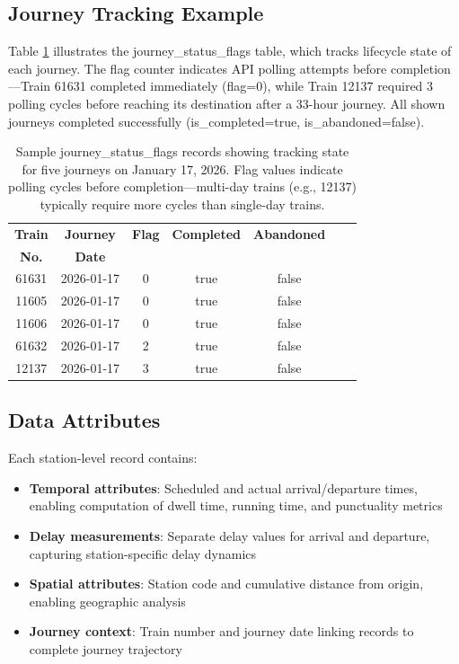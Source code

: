 \documentclass[11pt,a4paper]{article}
\begin{document}
\subsection{Journey Tracking Example}

Table \ref{tab:journey_flags} illustrates the journey\_status\_flags table, which tracks lifecycle state of each journey. The flag counter indicates API polling attempts before completion—Train 61631 completed immediately (flag=0), while Train 12137 required 3 polling cycles before reaching its destination after a 33-hour journey. All shown journeys completed successfully (is\_completed=true, is\_abandoned=false).

\begin{table}[h]
\centering
\small
\begin{tabular}{@{}ccccccc@{}}
\toprule
\textbf{Train} & \textbf{Journey} & \textbf{Flag} & \textbf{Completed} & \textbf{Abandoned} \\
\textbf{No.} & \textbf{Date} & & & \\
\midrule
61631 & 2026-01-17 & 0 & true & false \\
11605 & 2026-01-17 & 0 & true & false \\
11606 & 2026-01-17 & 0 & true & false \\
61632 & 2026-01-17 & 2 & true & false \\
12137 & 2026-01-17 & 3 & true & false \\
\bottomrule
\end{tabular}
\caption{Sample journey\_status\_flags records showing tracking state for five journeys on January 17, 2026. Flag values indicate polling cycles before completion—multi-day trains (e.g., 12137) typically require more cycles than single-day trains.}
\label{tab:journey_flags}
\end{table}

\subsection{Data Attributes}

Each station-level record contains:

\begin{itemize}
    \item \textbf{Temporal attributes}: Scheduled and actual arrival/departure times, enabling computation of dwell time, running time, and punctuality metrics
    \item \textbf{Delay measurements}: Separate delay values for arrival and departure, capturing station-specific delay dynamics
    \item \textbf{Spatial attributes}: Station code and cumulative distance from origin, enabling geographic analysis
    \item \textbf{Journey context}: Train number and journey date linking records to complete journey trajectory
\end{itemize}
\end{document}
